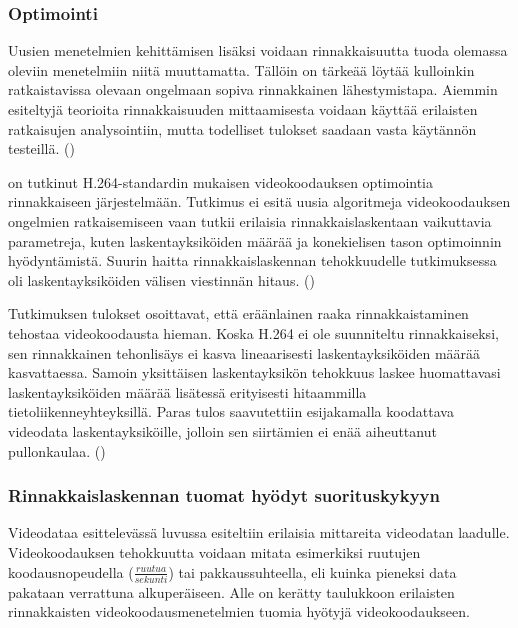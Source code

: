 \subsubsection{Optimointi}

Uusien menetelmien kehittämisen lisäksi voidaan rinnakkaisuutta tuoda
olemassa oleviin menetelmiin niitä muuttamatta. Tällöin on tärkeää löytää
kulloinkin ratkaistavissa olevaan ongelmaan sopiva rinnakkainen lähestymistapa.
Aiemmin esiteltyjä teorioita rinnakkaisuuden mittaamisesta voidaan käyttää
erilaisten ratkaisujen analysointiin, mutta todelliset tulokset saadaan
vasta käytännön testeillä. (\cite{li})

\citealt{li} on tutkinut H.264-standardin mukaisen videokoodauksen optimointia
rinnakkaiseen järjestelmään. Tutkimus ei esitä uusia algoritmeja
videokoodauksen ongelmien ratkaisemiseen vaan tutkii erilaisia
rinnakkaislaskentaan vaikuttavia parametreja, kuten laskentayksiköiden määrää
ja konekielisen tason optimoinnin hyödyntämistä. Suurin haitta
rinnakkaislaskennan tehokkuudelle tutkimuksessa oli laskentayksiköiden välisen
viestinnän hitaus. (\citealt{li})

Tutkimuksen tulokset osoittavat, että eräänlainen raaka rinnakkaistaminen
tehostaa videokoodausta hieman. Koska H.264 ei ole suunniteltu rinnakkaiseksi,
sen rinnakkainen tehonlisäys ei kasva lineaarisesti laskentayksiköiden määrää
kasvattaessa. Samoin yksittäisen laskentayksikön tehokkuus laskee huomattavasi
laskentayksiköiden määrää lisätessä erityisesti hitaammilla
tietoliikenneyhteyksillä. Paras tulos saavutettiin esijakamalla koodattava
videodata laskentayksiköille, jolloin sen siirtämien ei enää aiheuttanut
pullonkaulaa. (\citealt{li})

\subsubsection{Rinnakkaislaskennan tuomat hyödyt suorituskykyyn}

Videodataa esittelevässä luvussa esiteltiin erilaisia mittareita videodatan
laadulle. Videokoodauksen tehokkuutta voidaan mitata esimerkiksi ruutujen
koodausnopeudella ($\frac{ruutua}{sekunti}$) tai pakkaussuhteella, eli kuinka
pieneksi data pakataan verrattuna alkuperäiseen. Alle on kerätty taulukkoon
erilaisten rinnakkaisten videokoodausmenetelmien tuomia hyötyjä
videokoodaukseen.

